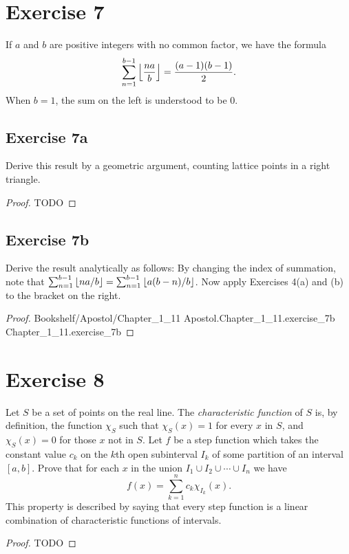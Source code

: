 \documentclass{article}
\newcommand{\link}[1]{\lean{../..}
  {Bookshelf/Apostol/Chapter\_1\_11}
  {Apostol.Chapter\_1\_11.#1}
  {Chapter\_1\_11.#1}
}
\begin{document}
\section{Exercise 7}%
\label{sec:exercise-7}

If $a$ and $b$ are positive integers with no common factor, we have the formula
  $$\sum_{n=1}^{b-1} \left\lfloor\frac{na}{b}\right\rfloor = \frac{(a - 1)(b - 1)}{2}.$$
When $b = 1$, the sum on the left is understood to be $0$.

\subsection{Exercise 7a}%
\label{sub:exercise-7a}

Derive this result by a geometric argument, counting lattice points in a right
  triangle.

\begin{proof}

  TODO

\end{proof}

\subsection{Exercise 7b}%
\label{sub:exercise-7b}

Derive the result analytically as follows:
By changing the index of summation, note that
  $\sum_{n=1}^{b-1} \left\lfloor na / b\right\rfloor = \sum_{n=1}^{b-1} \left\lfloor a(b - n) / b\right\rfloor$.
Now apply Exercises 4(a) and (b) to the bracket on the right.

\begin{proof}

  \link{exercise\_7b}

\end{proof}

\section{Exercise 8}%
\label{sec:exercise-8}

Let $S$ be a set of points on the real line.
The \textit{characteristic function} of $S$ is, by definition, the function
  $\chi_S$ such that $\chi_S(x) = 1$ for every $x$ in $S$, and $\chi_S(x) = 0$
  for those $x$ not in $S$.
Let $f$ be a step function which takes the constant value $c_k$ on the $k$th
  open subinterval $I_k$ of some partition of an interval $[a, b]$.
Prove that for each $x$ in the union $I_1 \cup I_2 \cup \cdots \cup I_n$ we have
  $$f(x) = \sum_{k=1}^n c_k\chi_{I_k}(x).$$
This property is described by saying that every step function is a linear
  combination of characteristic functions of intervals.

\begin{proof}

  TODO

\end{proof}
\end{document}

